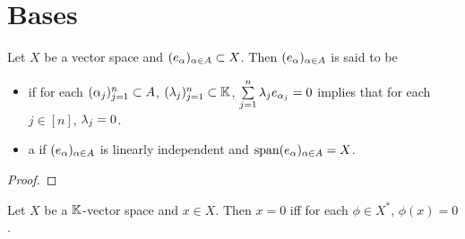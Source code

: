 \documentclass{book}
\begin{document}
	
	
	
	
	
	
	
	
	
	
	
	
	
	
	
	
	
	
	
	
	
	
	
	
	
	
	
	
	
	
	
	
	
	
	
	\section{Bases}
	
	\begin{defn}
		Let $X$ be a vector space and $(e_{\alpha})_{\alpha \in A} \subset X$. Then $(e_{\alpha})_{\alpha \in A}$ is said to be
		\begin{itemize}
			\item {} if for each $(\alpha_j)_{j=1}^n \subset A$, $(\lambda_j)_{j=1}^n \subset \mathbb{K}$, $\sum\limits_{j=1}^n \lambda_j e_{\alpha_j} = 0$ implies that for each $j \in [n]$, $\lambda_j = 0$.  
			\item a  if $(e_{\alpha})_{\alpha \in A}$ is linearly independent and $\operatorname{span} (e_{\alpha})_{\alpha \in A} = X$. 
		\end{itemize}
	\end{defn}
	
	\begin{ex}
	\end{ex}
	
	\begin{proof}
		
	\end{proof}
	
	\begin{ex}
		
	\end{ex}
	
	
	\begin{ex}
		Let $X$ be a $\mathbb{K}$-vector space and $x \in X$. Then $x = 0$ iff for each $\phi \in X^*$, $\phi(x) = 0$. 
	\end{ex}
	
\end{document}
